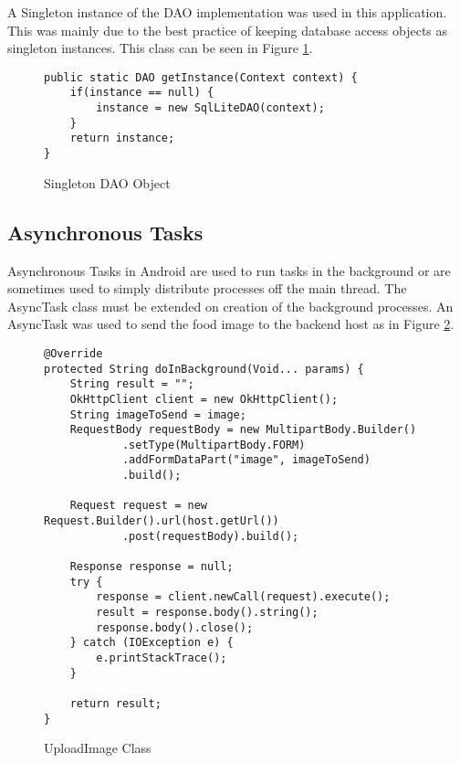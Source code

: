 A Singleton instance of the DAO implementation was used in this application.
This was mainly due to the best practice of keeping database access objects as singleton instances.
This class can be seen in Figure \ref{lst:singletonDao}.

\begin{figure}[h]
\caption{Singleton DAO Object}
\label{lst:singletonDao}
\begin{lstlisting}[style=Java]
public static DAO getInstance(Context context) {
    if(instance == null) {
        instance = new SqlLiteDAO(context);
    }
    return instance;
}
\end{lstlisting}
\end{figure}

\tocless\subsection{Asynchronous Tasks}
Asynchronous Tasks in Android are used to run tasks in the background or are sometimes used to simply distribute processes off the main thread.
The AsyncTask class must be extended on creation of the background processes.
An AsyncTask was used to send the food image to the backend host as in Figure \ref{lst:rrCode}.
\begin{figure}[h]
\caption{UploadImage Class}
\label{lst:rrCode}
\begin{lstlisting}[style=Java]
@Override
protected String doInBackground(Void... params) {
    String result = "";
    OkHttpClient client = new OkHttpClient();
    String imageToSend = image;
    RequestBody requestBody = new MultipartBody.Builder()
            .setType(MultipartBody.FORM)
            .addFormDataPart("image", imageToSend)
            .build();

    Request request = new Request.Builder().url(host.getUrl())
            .post(requestBody).build();

    Response response = null;
    try {
        response = client.newCall(request).execute();
        result = response.body().string();
        response.body().close();
    } catch (IOException e) {
        e.printStackTrace();
    }

    return result;
}
\end{lstlisting}
\end{figure}

